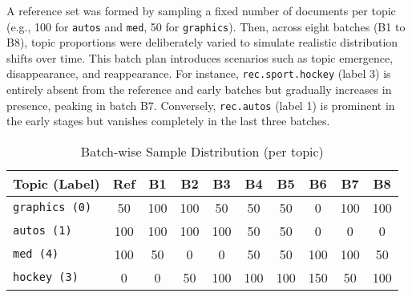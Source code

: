 A reference set was formed by sampling a fixed number of documents per topic
(e.g., 100 for \texttt{autos} and \texttt{med}, 50 for \texttt{graphics}).
Then, across eight batches (B1 to B8), topic proportions were deliberately
varied to simulate realistic distribution shifts over time. This batch plan
introduces scenarios such as topic emergence, disappearance, and reappearance.
For instance, \texttt{rec.sport.hockey} (label 3) is entirely absent from the
reference and early batches but gradually increases in presence, peaking in
batch B7. Conversely, \texttt{rec.autos} (label 1) is prominent in the early
stages but vanishes completely in the last three batches.

\begin{table}[H]
    \centering
    \begin{tabular}{lccccccccc}
        \hline
        \textbf{Topic (Label)} & Ref & B1  & B2  & B3  & B4  & B5  & B6  & B7  & B8  \\
        \hline
        \texttt{graphics (0)}  & 50  & 100 & 100 & 50  & 50  & 50  & 0   & 100 & 100 \\
        \texttt{autos (1)}     & 100 & 100 & 100 & 100 & 50  & 50  & 0   & 0   & 0   \\
        \texttt{med (4)}       & 100 & 50  & 0   & 0   & 50  & 50  & 100 & 100 & 50  \\
        \texttt{hockey (3)}    & 0   & 0   & 50  & 100 & 100 & 100 & 150 & 50  & 100 \\
        \hline
    \end{tabular}
    \caption{Batch-wise Sample Distribution (per topic)}
\end{table}